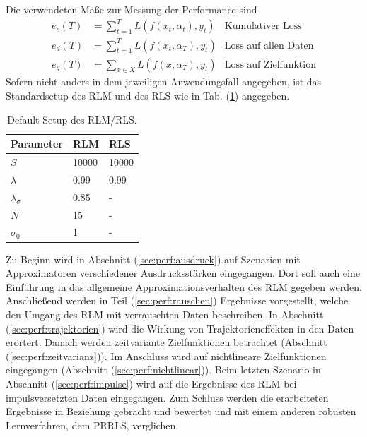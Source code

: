 \documentclass[a4paper, 12pt]{article}
\begin{document}
{Die verwendeten Maße zur Messung der Performance sind
\begin{align}
  e_c(T) &= \sum_{t=1}^{T} L(f(x_t,\alpha_t),y_t) & \text{Kumulativer Loss}\nonumber\\
  e_d(T) &= \sum_{t=1}^{T} L(f(x_t,\alpha_T),y_t) & \text{Loss auf allen Daten}\nonumber\\
  e_g(T) &= \sum_{x \in X} L(f(x,\alpha_T),y_t) & \text{Loss auf Zielfunktion}\nonumber
\end{align}
Sofern nicht anders in dem jeweiligen Anwendungsfall angegeben, ist das Standardsetup des RLM und des RLS wie in Tab. (\ref{tbl:perf:setup}) angegeben.
\begin{table}[H]
    \center
    \begin{tabular}{| l | l | l |}
    \hline
    \textbf{Parameter} & \textbf{RLM} & \textbf{RLS} \\ \hline \hline
    $S$ & 10000 & 10000 \\ \hline
    $\lambda$ & 0.99 & 0.99 \\ \hline
    $\lambda_\sigma$ & 0.85 & - \\ \hline
    $N$ & 15 & - \\ \hline
    $\sigma_0$ & 1 & - \\ \hline
    \end{tabular}
    \caption{Default-Setup des RLM/RLS.}
    \label{tbl:perf:setup}
\end{table}

Zu Beginn wird in Abschnitt (\ref{sec:perf:ausdruck}) auf Szenarien mit Approximatoren verschiedener Ausdrucksstärken eingegangen. Dort soll auch eine Einführung in das allgemeine Approximationsverhalten des RLM gegeben werden. Anschließend werden in Teil (\ref{sec:perf:rauschen}) Ergebnisse vorgestellt, welche den Umgang des RLM mit verrauschten Daten beschreiben. In Abschnitt (\ref{sec:perf:trajektorien}) wird die Wirkung von Trajektorieneffekten in den Daten erörtert. Danach werden zeitvariante Zielfunktionen betrachtet (Abschnitt (\ref{sec:perf:zeitvarianz})). Im Anschluss wird auf nichtlineare Zielfunktionen eingegangen (Abschnitt (\ref{sec:perf:nichtlinear})). Beim letzten Szenario in Abschnitt (\ref{sec:perf:impulse}) wird auf die Ergebnisse des RLM bei impulsversetzten Daten eingegangen. Zum Schluss werden die erarbeiteten Ergebnisse in Beziehung gebracht und bewertet und mit einem anderen robusten Lernverfahren, dem PRRLS, verglichen.

}
\end{document}
